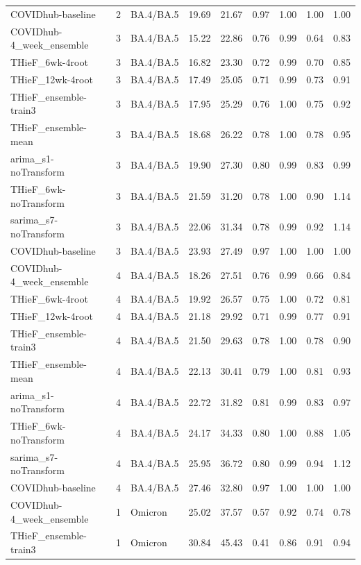 \documentclass[thesis]{umassthesis}  %
\begin{document}
\begin{longtable}{lrlrrrrrr}
  COVIDhub-baseline & 2 & BA.4/BA.5 & 19.69 & 21.67 & 0.97 & 1.00 & 1.00 & 1.00 \\ 
  COVIDhub-4\_week\_ensemble & 3 & BA.4/BA.5 & 15.22 & 22.86 & 0.76 & 0.99 & 0.64 & 0.83 \\ 
  THieF\_6wk-4root & 3 & BA.4/BA.5 & 16.82 & 23.30 & 0.72 & 0.99 & 0.70 & 0.85 \\ 
  THieF\_12wk-4root & 3 & BA.4/BA.5 & 17.49 & 25.05 & 0.71 & 0.99 & 0.73 & 0.91 \\ 
  THieF\_ensemble-train3 & 3 & BA.4/BA.5 & 17.95 & 25.29 & 0.76 & 1.00 & 0.75 & 0.92 \\ 
  THieF\_ensemble-mean & 3 & BA.4/BA.5 & 18.68 & 26.22 & 0.78 & 1.00 & 0.78 & 0.95 \\ 
  arima\_s1-noTransform & 3 & BA.4/BA.5 & 19.90 & 27.30 & 0.80 & 0.99 & 0.83 & 0.99 \\ 
  THieF\_6wk-noTransform & 3 & BA.4/BA.5 & 21.59 & 31.20 & 0.78 & 1.00 & 0.90 & 1.14 \\ 
  sarima\_s7-noTransform & 3 & BA.4/BA.5 & 22.06 & 31.34 & 0.78 & 0.99 & 0.92 & 1.14 \\ 
  COVIDhub-baseline & 3 & BA.4/BA.5 & 23.93 & 27.49 & 0.97 & 1.00 & 1.00 & 1.00 \\ 
  COVIDhub-4\_week\_ensemble & 4 & BA.4/BA.5 & 18.26 & 27.51 & 0.76 & 0.99 & 0.66 & 0.84 \\ 
  THieF\_6wk-4root & 4 & BA.4/BA.5 & 19.92 & 26.57 & 0.75 & 1.00 & 0.72 & 0.81 \\ 
  THieF\_12wk-4root & 4 & BA.4/BA.5 & 21.18 & 29.92 & 0.71 & 0.99 & 0.77 & 0.91 \\ 
  THieF\_ensemble-train3 & 4 & BA.4/BA.5 & 21.50 & 29.63 & 0.78 & 1.00 & 0.78 & 0.90 \\ 
  THieF\_ensemble-mean & 4 & BA.4/BA.5 & 22.13 & 30.41 & 0.79 & 1.00 & 0.81 & 0.93 \\ 
  arima\_s1-noTransform & 4 & BA.4/BA.5 & 22.72 & 31.82 & 0.81 & 0.99 & 0.83 & 0.97 \\ 
  THieF\_6wk-noTransform & 4 & BA.4/BA.5 & 24.17 & 34.33 & 0.80 & 1.00 & 0.88 & 1.05 \\ 
  sarima\_s7-noTransform & 4 & BA.4/BA.5 & 25.95 & 36.72 & 0.80 & 0.99 & 0.94 & 1.12 \\ 
  COVIDhub-baseline & 4 & BA.4/BA.5 & 27.46 & 32.80 & 0.97 & 1.00 & 1.00 & 1.00 \\ 
  COVIDhub-4\_week\_ensemble & 1 & Omicron & 25.02 & 37.57 & 0.57 & 0.92 & 0.74 & 0.78 \\ 
  THieF\_ensemble-train3 & 1 & Omicron & 30.84 & 45.43 & 0.41 & 0.86 & 0.91 & 0.94 \\ 

\end{longtable}
\end{document}
